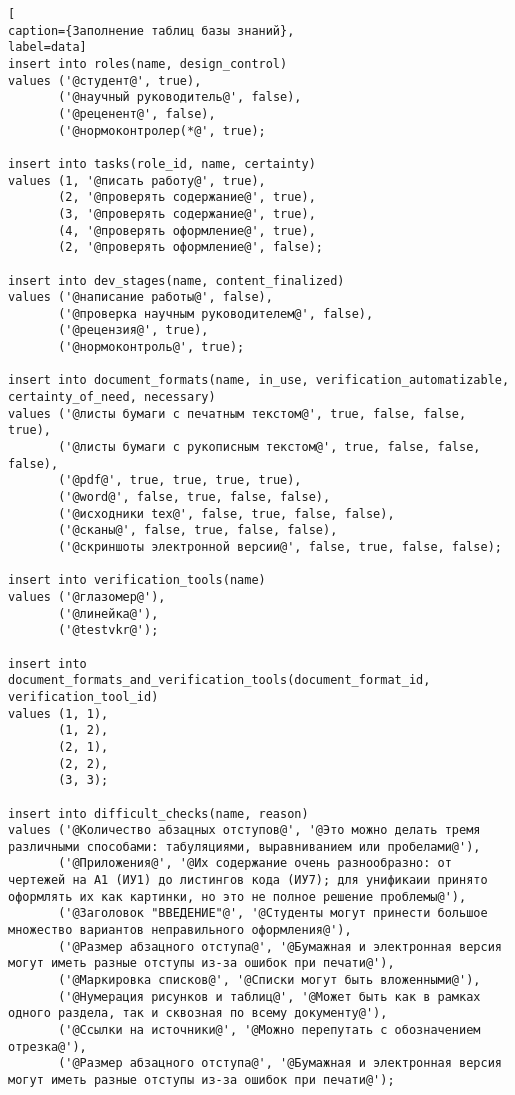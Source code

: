 \begin{lstlisting}[
caption={Заполнение таблиц базы знаний},
label=data]
insert into roles(name, design_control)
values ('@студент@', true),
       ('@научный руководитель@', false),
       ('@реценент@', false),
       ('@нормоконтролер(*@', true);

insert into tasks(role_id, name, certainty)
values (1, '@писать работу@', true),
       (2, '@проверять содержание@', true),
       (3, '@проверять содержание@', true),
       (4, '@проверять оформление@', true),
       (2, '@проверять оформление@', false);

insert into dev_stages(name, content_finalized)
values ('@написание работы@', false),
       ('@проверка научным руководителем@', false),
       ('@рецензия@', true),
       ('@нормоконтроль@', true);

insert into document_formats(name, in_use, verification_automatizable, certainty_of_need, necessary)
values ('@листы бумаги с печатным текстом@', true, false, false, true),
       ('@листы бумаги с рукописным текстом@', true, false, false, false),
       ('@pdf@', true, true, true, true),
       ('@word@', false, true, false, false),
       ('@исходники tex@', false, true, false, false),
       ('@сканы@', false, true, false, false),
       ('@скриншоты электронной версии@', false, true, false, false);

insert into verification_tools(name)
values ('@глазомер@'),
       ('@линейка@'),
       ('@testvkr@');

insert into document_formats_and_verification_tools(document_format_id, verification_tool_id)
values (1, 1),
       (1, 2),
       (2, 1),
       (2, 2),
       (3, 3);

insert into difficult_checks(name, reason)
values ('@Количество абзацных отступов@', '@Это можно делать тремя различными способами: табуляциями, выравниванием или пробелами@'),
       ('@Приложения@', '@Их содержание очень разнообразно: от чертежей на А1 (ИУ1) до листингов кода (ИУ7); для унификаии принято оформлять их как картинки, но это не полное решение проблемы@'),
       ('@Заголовок "ВВЕДЕНИЕ"@', '@Студенты могут принести большое множество вариантов неправильного оформления@'),
       ('@Размер абзацного отступа@', '@Бумажная и электронная версия могут иметь разные отступы из-за ошибок при печати@'),
       ('@Маркировка списков@', '@Списки могут быть вложенными@'),
       ('@Нумерация рисунков и таблиц@', '@Может быть как в рамках одного раздела, так и сквозная по всему документу@'),
       ('@Ссылки на источники@', '@Можно перепутать с обозначением отрезка@'),
       ('@Размер абзацного отступа@', '@Бумажная и электронная версия могут иметь разные отступы из-за ошибок при печати@');


\end{lstlisting}
